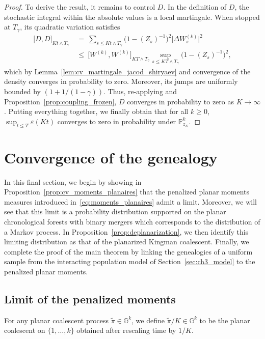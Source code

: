 \begin{refsegment}
\begin{proof}
To derive the result, it remains to control $D$. In the definition of $D$,  the stochastic integral within the absolute values is a local martingale. When stopped at $T_{\gamma}$, its quadratic variation satisfies
\begin{align*}
   \big[D,D\big]_{Kt\wedge T_{\gamma}}\ &=\ \sum_{s\leqslant Kt \wedge T_{\gamma}} \big(1-(Z_s)^{-1}\big)^2\big|\Delta W^{(k)}_s\big|^2\\
   &\leqslant\    \big[ W^{(k)},W^{(k)}\big]_{KT\wedge T_{\gamma}}\sup_{s\leqslant KT \wedge T_{\gamma}}\big(1-(Z_{s})^{-1}\big)^2,
\end{align*}
which by Lemma~\ref{lem:cv_martingale_jacod_shiryaev} and convergence of the density converges in probability to zero. Moreover, its jumps are uniformly bounded by $(1+1/(1-\gamma))$. Thus, re-applying \cite[Chapter VIII, Theorem 3.11]{jacod-shiryaev} and Proposition~\ref{prop:coupling_frozen}, $D$ converges in probability to zero as $K\to\infty$.
Putting everything together, we finally obtain that for all $k\geqslant 0$, $\sup_{t\leqslant T}\varepsilon(Kt)$ converges to zero in probability under $\mathbb{P}^k_{z_K}$.
\end{proof}



\section{Convergence of the genealogy}\label{sec:ch3_convergence}

In this final section, we begin by showing in
Proposition~\ref{prop:cv_moments_planaires} that the penalized planar
moments measures introduced in~\eqref{eq:moments_planaires} admit a limit.
Moreover, we will see that this limit is a probability distribution
supported on the planar chronological forests with binary mergers which corresponds to the distribution of a Markov process. In Proposition~\ref{prop:deplanarization}, we
then identify this limiting distribution as that of the planarized Kingman
coalescent. Finally, we complete the proof of the main theorem by linking
the genealogies of a uniform sample from the interacting
population model of Section~\ref{sec:ch3_model} to the penalized planar
moments.

\subsection{Limit of the penalized moments}

For any planar coalescent process $\tilde\pi\in \mathbb{G}^{k}$, we define
$\tilde\pi/K\in \mathbb{G}^{k}$ to be the planar coalescent on $\{1,\ldots, k\}$ obtained after rescaling time
by $1/K$.


\end{refsegment}
